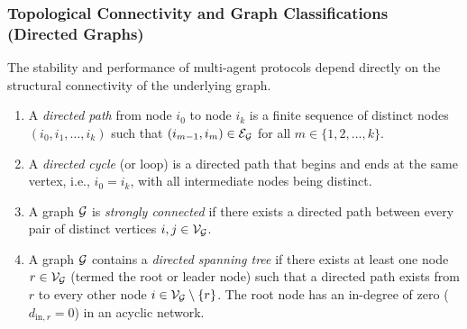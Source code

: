 \subsubsection{Topological Connectivity and Graph Classifications (Directed Graphs)}
The stability and performance of multi-agent protocols depend directly on the structural connectivity of the underlying graph. 
\begin{definition}\label{def:paths_cycles}
\leavevmode\par\noindent
\begin{enumerate}
    \item A \emph{directed path} from node $i_0$ to node $i_k$ is a finite sequence of distinct nodes $(i_0, i_1, \dots, i_k)$ such that $(i_{m-1}, i_m) \in {\mathcal{E}}_{\mathcal{G}}$ for all $m \in \{1, 2, \dots, k\}$.
    \item A \emph{directed cycle} (or loop) is a directed path that begins and ends at the same vertex, i.e., $i_0 = i_k$, with all intermediate nodes being distinct.
    \item A graph $\mathcal{G}$ is \emph{strongly connected} if there exists a directed path between every pair of distinct vertices $i, j \in {\mathcal{V}}_{\mathcal{G}}$.
    \item A graph $\mathcal{G}$ contains a \emph{directed spanning tree} if there exists at least one node $r \in {\mathcal{V}}_{\mathcal{G}}$ (termed the root or leader node) such that a directed path exists from $r$ to every other node $i \in {\mathcal{V}}_{\mathcal{G}} \setminus \{r\}$. The root node has an in-degree of zero ($d_{\text{in}, r} = 0$) in an acyclic network.
\end{enumerate}
\end{definition}


